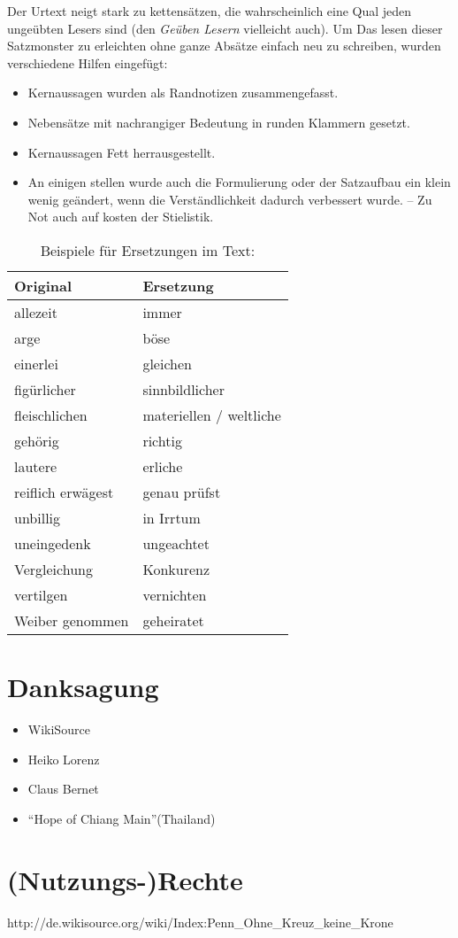 \medskip

Der Urtext neigt stark zu kettensätzen, die wahrscheinlich eine Qual jeden
ungeübten Lesers sind (den \textit{Geüben Lesern} vielleicht auch). Um
Das lesen dieser Satzmonster zu erleichten ohne ganze Absätze einfach neu
zu schreiben, wurden verschiedene Hilfen eingefügt:

\begin{itemize}
 \item Kernaussagen wurden als Randnotizen zusammengefasst.
 \item Nebensätze mit nachrangiger Bedeutung in runden Klammern gesetzt.
 \item Kernaussagen Fett herrausgestellt.
 \item An einigen stellen wurde auch die Formulierung oder der Satzaufbau
 ein klein wenig geändert, wenn die Verständlichkeit dadurch verbessert wurde.
 -- Zu Not auch auf kosten der Stielistik.
\end{itemize}

\begin{table} \centering
\caption{Beispiele für Ersetzungen im Text:}
\begin{tabular}{|l|l|} \hline
\textbf{Original} 	& \textbf{Ersetzung} 		\\ \hline \hline
allezeit 		& immer  			\\ \hline
arge 			& böse  			\\ \hline
einerlei 		& gleichen 	 		\\ \hline
figürlicher 		& sinnbildlicher  		\\ \hline
fleischlichen  		& materiellen / weltliche  	\\ \hline
gehörig 		& richtig			\\ \hline
lautere 		& erliche   			\\ \hline
reiflich erwägest 	& genau prüfst 			\\ \hline
unbillig       		& in Irrtum  			\\ \hline
uneingedenk 		& ungeachtet			\\ \hline
Vergleichung 		& Konkurenz  			\\ \hline
vertilgen 		& vernichten			\\ \hline
Weiber genommen 	& geheiratet  			\\ \hline
 
\end{tabular} 

\end{table}

\chapter{Danksagung}

\begin{itemize}
 \item WikiSource
 \item Heiko Lorenz
 \item Claus Bernet
 \item "`Hope of Chiang Main"'(Thailand)
\end{itemize}


\chapter{(Nutzungs-)Rechte}
http://de.wikisource.org/wiki/Index:Penn\_Ohne\_Kreuz\_keine\_Krone
